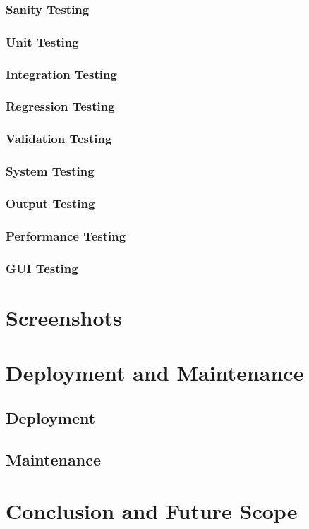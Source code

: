 \documentclass[a4paper, oneside, 12pt]{book}
\begin{document}
			\subsubsection{Sanity Testing}
			\subsubsection{Unit Testing}
			\subsubsection{Integration Testing}
			\subsubsection{Regression Testing}
			\subsubsection{Validation Testing}
			\subsubsection{System Testing}
			\subsubsection{Output Testing}
			\subsubsection{Performance Testing}
			\subsubsection{GUI Testing}
	\newpage
	\section{Screenshots}
	\newpage
	\section{Deployment and Maintenance}
	\newpage
		\subsection{Deployment}
		\subsection{Maintenance}
	\newpage
	\section{Conclusion and Future Scope}
	\newpage
\end{document}
